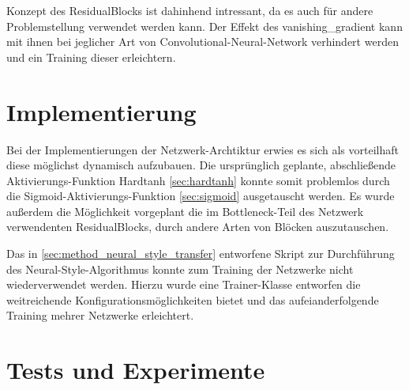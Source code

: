 Konzept des ResidualBlocks ist dahinhend intressant, da es auch für andere Problemstellung verwendet werden kann. Der Effekt des \gls{vanishing_gradient} kann mit ihnen bei jeglicher Art von Convolutional-Neural-Network verhindert werden und ein Training dieser erleichtern.

\section{Implementierung}

Bei der Implementierungen der Netzwerk-Archtiktur erwies es sich als vorteilhaft diese möglichst dynamisch aufzubauen. Die ursprünglich geplante, abschließende Aktivierungs-Funktion Hardtanh \ref{sec:hardtanh} konnte somit problemlos durch die Sigmoid-Aktivierungs-Funktion \ref{sec:sigmoid} ausgetauscht werden. Es wurde außerdem die Möglichkeit vorgeplant die im Bottleneck-Teil des Netzwerk verwendenten ResidualBlocks, durch andere Arten von Blöcken auszutauschen.

Das in \ref{sec:method_neural_style_transfer} entworfene Skript zur Durchführung des Neural-Style-Algorithmus konnte zum Training der Netzwerke nicht wiederverwendet werden. Hierzu wurde eine Trainer-Klasse entworfen die weitreichende Konfigurationsmöglichkeiten bietet und das aufeianderfolgende Training mehrer Netzwerke erleichtert.

\section{Tests und Experimente}